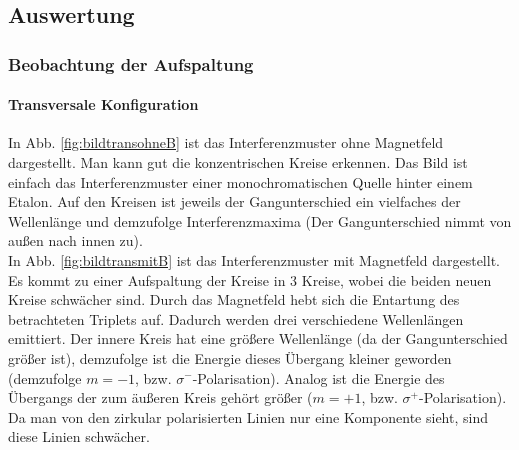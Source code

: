 \newpage

\subsection{Auswertung}
\subsubsection{Beobachtung der Aufspaltung}
\paragraph{Transversale Konfiguration}
In Abb. \ref{fig:bildtransohneB} ist das Interferenzmuster ohne Magnetfeld dargestellt. Man kann gut die konzentrischen Kreise erkennen. Das Bild ist einfach das Interferenzmuster einer monochromatischen Quelle hinter einem Etalon. Auf den Kreisen ist jeweils der Gangunterschied ein vielfaches der Wellenlänge und demzufolge Interferenzmaxima (Der Gangunterschied nimmt von außen nach innen zu).\\
In Abb. \ref{fig:bildtransmitB} ist das Interferenzmuster mit Magnetfeld dargestellt. Es kommt zu einer Aufspaltung der Kreise in 3 Kreise, wobei die beiden neuen Kreise schwächer sind. Durch das Magnetfeld hebt sich die Entartung des betrachteten Triplets auf. Dadurch werden drei verschiedene Wellenlängen emittiert. Der innere Kreis hat eine größere Wellenlänge (da der Gangunterschied größer ist), demzufolge ist die Energie dieses Übergang kleiner geworden (demzufolge $m = -1$, bzw. $\sigma^-$-Polarisation). Analog ist die Energie des Übergangs der zum äußeren Kreis gehört größer ($m = +1$, bzw. $\sigma^+$-Polarisation). Da man von den zirkular polarisierten Linien nur eine Komponente sieht, sind diese Linien schwächer.\\

